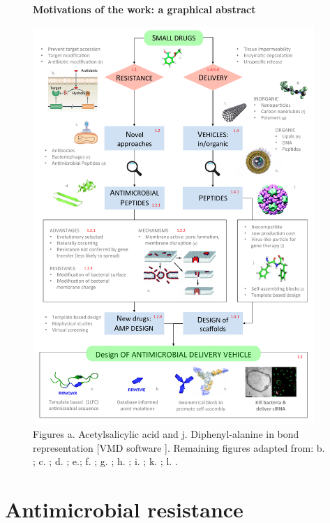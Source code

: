 \begin{figure}[p!]
\begin{center}
\Large{\textbf{Motivations of the work: a graphical abstract}}\par\bigskip
\includegraphics[width = 0.95\textwidth]{1introduction/pics/scheme_intro}
\caption[Graphical abstract of introduction]{Figures a. Acetylsalicylic acid and j. Diphenyl-alanine in bond representation [VMD software \citet{HUMP96}]. Remaining figures adapted from: b. \citet{Blair2014}; c. \citet{phage}; d. \citet{Torres2019}; e.\citet{Nguyen2011}; f. \citet{nanotube}; g. \citet{poly}; h. \citep{lipo}; i. \citet{Schoonen2014}; k. \citet{Castelletto2016}; l. \citet{Kepiro2019}.} \label{fig:intro}
\end{center}
\end{figure}


\section{Antimicrobial resistance}

